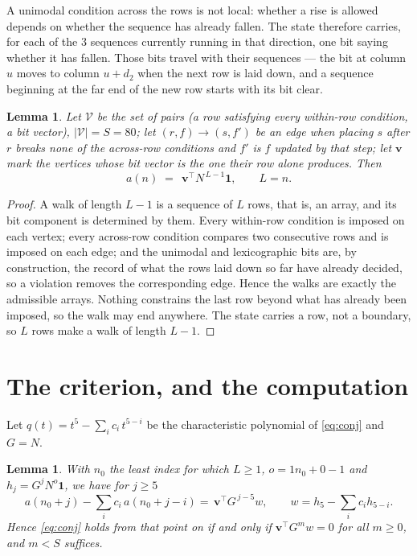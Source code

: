 \documentclass[11pt,a4paper]{article}
\theoremstyle{plain}
\newtheorem{lemma}[theorem]{Lemma}
\theoremstyle{definition}
\begin{document}
A unimodal condition across the rows is not local: whether a
rise is allowed depends on whether the sequence has already fallen. The state therefore
carries, for each of the $3$ sequences currently running in that direction, one bit saying
whether it has fallen. Those bits travel with their sequences --- the bit at column $u$
moves to column $u+d_2$ when the next row is laid down, and a sequence beginning at the
far end of the new row starts with its bit clear.

\begin{lemma}\label{lem:walk}
Let $\mathcal V$ be the set of pairs (a row satisfying every within-row condition, a
bit vector), $|\mathcal V|=S=80$; let $(r,f)\to(s,f')$ be an edge when placing $s$ after $r$
breaks none of the across-row conditions and $f'$ is $f$ updated by that step; let
$\mathbf{v}$ mark the vertices whose bit vector is the one their row alone produces.
Then
\[
a(n)\;=\;\,\mathbf{v}^{\!\top}N^{\,L-1}\mathbf{1},\qquad L=n.
\]
\end{lemma}

\begin{proof}
A walk of length $L-1$ is a sequence of $L$ rows, that is, an array, and its bit component
is determined by them. Every within-row condition is imposed on each vertex; every
across-row condition compares two consecutive rows and is imposed on each edge; and the
unimodal and lexicographic bits are, by construction, the record of what the rows laid down
so far have already decided, so a violation removes the corresponding edge. Hence the walks
are exactly the admissible arrays. Nothing constrains the last row beyond what has already
been imposed, so the walk may end anywhere. The state carries a row, not a boundary, so
$L$ rows make a walk of length $L-1$.
\end{proof}

\section{The criterion, and the computation}

Let $q(t)=t^{5}-\sum_i c_i\,t^{5-i}$ be the characteristic polynomial of
\eqref{eq:conj} and $G=N$.

\begin{lemma}\label{lem:crit}
With $n_0$ the least index for which $L\ge1$, $o=1n_0+0-1$ and
$h_j=G^{j}N^{o}\mathbf{1}$, we have for $j\ge5$
\[
a(n_0+j)-\sum_i c_i\,a(n_0+j-i)=\,\mathbf{v}^{\!\top}G^{\,j-5}w,
\qquad w=h_{5}-\sum_i c_ih_{5-i} .
\]
Hence \eqref{eq:conj} holds from that point on if and only if
$\mathbf{v}^{\!\top}G^{m}w=0$ for all $m\ge0$, and $m<S$ suffices.
\end{lemma}
\end{document}
